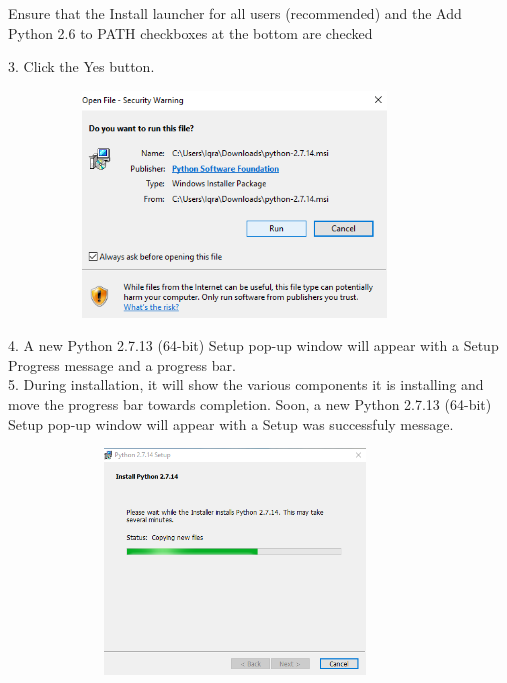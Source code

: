 \documentclass[11pt]{article}            %
\begin{document}
Ensure that the Install launcher for all users (recommended) and the Add \\ Python 2.6 to PATH checkboxes at the bottom are checked

3. Click the Yes button.\\

\begin{center}
  \includegraphics[width=12cm,height=6cm,keepaspectratio]{8.png}\\
\end{center}


4.  A new Python 2.7.13 (64-bit) Setup pop-up window will appear with a Setup Progress message and a progress bar.\\
  



5.  During installation, it will show the various components it is installing and move the progress bar towards completion.
   Soon, a new Python 2.7.13 (64-bit) Setup pop-up window will appear with a Setup was successfuly message.\\ 

\begin{center}
  \includegraphics[width=12cm,height=6cm,keepaspectratio]{6.png}\\
\end{center}
\end{document}
